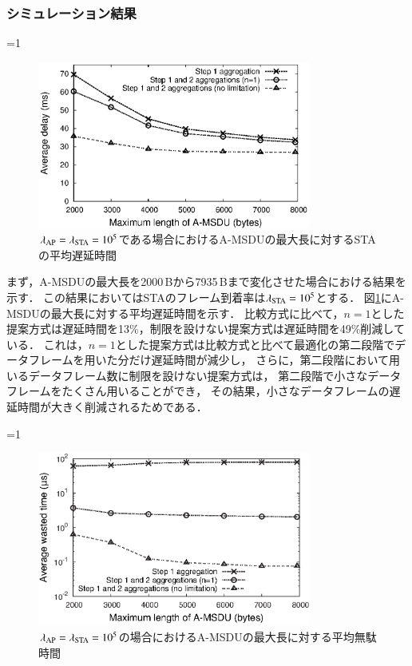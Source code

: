 \documentclass[master]{kuisthesis}		%
\newcounter{flagFig}
\begin{document}
		\subsubsection{シミュレーション結果}
			\ifnum\value{flagFig}=1 {\begin{figure}[t]
				\begin{center}
					\includegraphics[width=0.8\textwidth]{graph/dly_max.eps}
					\caption{$\lambda_{\rm AP}=\lambda_{\rm STA}=10^5$である場合におけるA-MSDUの最大長に対するSTAの平均遅延時間}
					\label{fig:dly_max}
				\end{center}
			\end{figure}}\fi
			まず，A-MSDUの最大長を2000\,Bから7935\,Bまで変化させた場合における結果を示す．
			この結果においてはSTAのフレーム到着率は$\lambda_{\rm STA}=10^5$とする．
			図\ref{fig:dly_max}にA-MSDUの最大長に対する平均遅延時間を示す．
			比較方式に比べて，$n=1$とした提案方式は遅延時間を13\%，制限を設けない提案方式は遅延時間を49\%削減している．
			これは，$n=1$とした提案方式は比較方式と比べて最適化の第二段階でデータフレームを用いた分だけ遅延時間が減少し，
			さらに，第二段階において用いるデータフレーム数に制限を設けない提案方式は，
			第二段階で小さなデータフレームをたくさん用いることができ，
			その結果，小さなデータフレームの遅延時間が大きく削減されるためである．
			\par
			\ifnum\value{flagFig}=1 {\begin{figure}[t]
				\begin{center}
					\includegraphics[width=0.8\textwidth]{graph/wst_max.eps}
					\caption{$\lambda_{\rm AP}=\lambda_{\rm STA}=10^5$の場合におけるA-MSDUの最大長に対する平均無駄時間}
					\label{fig:wst_max}
				\end{center}
			\end{figure}}\fi
\end{document}
